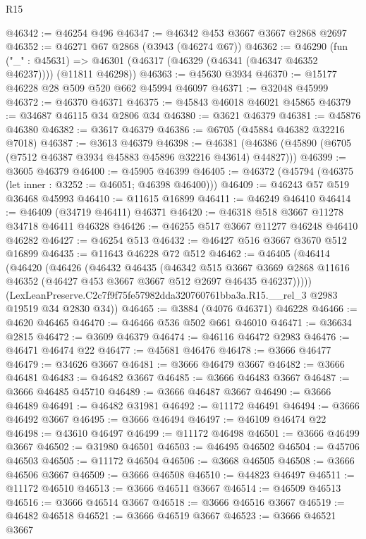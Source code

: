 \begin{lexlean}{R15}
\begin{coremodule}
@46342 := @46254 @496
@46347 := @46342 @453 @3667 @3667 @2868 @2697
@46352 := @46271 @67 @2868 (@3943 (@46274 @67))
@46362 := @46290
    (fun ("_" : @45631) => @46301 (@46317 (@46329 (@46341 (@46347 @46352 @46237)))) (@11811 @46298))
@46363 := @45630 @3934
@46370 := @15177 @46228 @28 @509 @520 @662 @45994 @46097
@46371 := @32048 @45999
@46372 := @46370 @46371
@46375 := @45843 @46018 @46021 @45865
@46379 := @34687 @46115 @34 @2806 @34
@46380 := @3621 @46379
@46381 := @45876 @46380
@46382 := @3617 @46379
@46386 := @6705 (@45884 @46382 @32216 @7018)
@46387 := @3613 @46379
@46398 := @46381 (@46386 (@45890 (@6705 (@7512 @46387 @3934 @45883 @45896 @32216 @43614) @44827)))
@46399 := @3605 @46379
@46400 := @45905 @46399
@46405 := @46372 (@45794 (@46375 (let inner : @3252 := @46051; @46398 @46400)))
@46409 := @46243 @57 @519 @36468 @45993
@46410 := @11615 @16899
@46411 := @46249 @46410
@46414 := @46409 (@34719 @46411) @46371
@46420 := @46318 @518 @3667 @11278 @34718 @46411 @46328
@46426 := @46255 @517 @3667 @11277 @46248 @46410 @46282
@46427 := @46254 @513
@46432 := @46427 @516 @3667 @3670 @512 @16899
@46435 := @11643 @46228 @72 @512
@46462 := @46405
    (@46414
      (@46420
        (@46426
          (@46432
            @46435
            (@46342
              @515
              @3667
              @3669
              @2868
              @11616
              @46352
              (@46427 @453 @3667 @3667 @512 @2697 @46435 @46237)))))
      (LexLeanPreserve.C2c7f9f75fe57982dda320760761bba3a.R15.__rel_3 @2983 @19519 @34 @2830 @34))
@46465 := @3884 (@4076 @46371) @46228
@46466 := @4620 @46465
@46470 := @46466 @536 @502 @661 @46010
@46471 := @36634 @2815
@46472 := @3609 @46379
@46474 := @46116 @46472 @2983
@46476 := @46471 @46474 @22
@46477 := @45681 @46476
@46478 := @3666 @46477
@46479 := @34626 @3667
@46481 := @3666 @46479 @3667
@46482 := @3666 @46481
@46483 := @46482 @3667
@46485 := @3666 @46483 @3667
@46487 := @3666 @46485 @45710
@46489 := @3666 @46487 @3667
@46490 := @3666 @46489
@46491 := @46482 @31981
@46492 := @11172 @46491
@46494 := @3666 @46492 @3667
@46495 := @3666 @46494
@46497 := @46109 @46474 @22
@46498 := @43610 @46497
@46499 := @11172 @46498
@46501 := @3666 @46499 @3667
@46502 := @31980 @46501
@46503 := @46495 @46502
@46504 := @45706 @46503
@46505 := @11172 @46504
@46506 := @3668 @46505
@46508 := @3666 @46506 @3667
@46509 := @3666 @46508
@46510 := @44823 @46497
@46511 := @11172 @46510
@46513 := @3666 @46511 @3667
@46514 := @46509 @46513
@46516 := @3666 @46514 @3667
@46518 := @3666 @46516 @3667
@46519 := @46482 @46518
@46521 := @3666 @46519 @3667
@46523 := @3666 @46521 @3667

\end{coremodule}
\end{lexlean}
